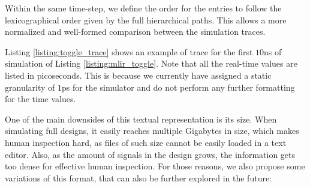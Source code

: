 Within the same time-step, we define the order for the entries to follow the lexicographical order given by the full hierarchical paths. This allows a more normalized and well-formed comparison between the simulation traces.

Listing \ref{listing:toggle_trace} shows an example of trace for the first $10$ns of simulation of Listing \ref{listing:mlir_toggle}. Note that all the real-time values are listed in picoseconds. This is because we currently have assigned a static granularity of $1$ps for the simulator and do not perform any further formatting for the time values.


One of the main downsides of this textual representation is its size. When simulating full designs, it easily reaches multiple Gigabytes in size, which makes human inspection hard, as files of such size cannot be easily loaded in a text editor. Also, as the amount of signals in the design grows, the information gets too dense for effective human inspection.
For those reasons, we also propose some variations of this format, that can also be further explored in the future:

